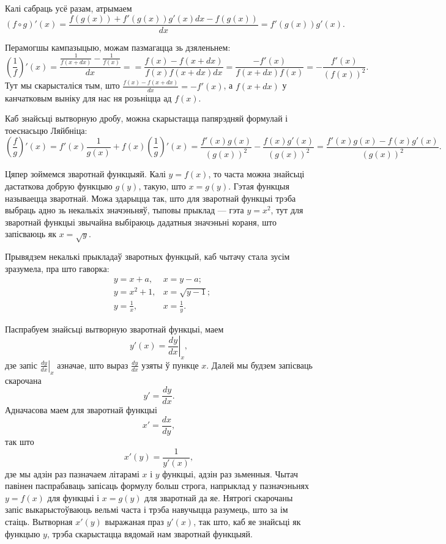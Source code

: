 \documentclass[10pt,a4paper]{book}
\theoremstyle{plain}
\begin{document}
Калі сабраць усё разам, атрымаем
\begin{equation*}
  (f \circ g)'(x) = \frac{f(g(x)) + f'(g(x))g'(x)dx - f(g(x))}{dx} =
  f'(g(x))g'(x).
\end{equation*}

Перамогшы кампазыцыю, можам пазмагацца зь дзяленьнем:
\begin{equation*}
  \left(\frac{1}{f}\right)'(x) = \frac{\frac{1}{f(x+dx)} - \frac{1}{f(x)}}{dx} =
  = \frac{f(x) - f(x+dx)}{f(x)f(x+dx)dx} = \frac{-f'(x)}{f(x+dx)f(x)} =
  - \frac{f'(x)}{(f(x))^2}.
\end{equation*}
Тут мы скарысталіся тым, што $\frac{f(x) - f(x+dx)}{dx} = -f'(x)$, а $f(x+dx)$ у
канчатковым выніку для нас ня розьніцца ад $f(x)$.

Каб знайсьці вытворную дробу, можна скарыстацца папярэдняй формулай і тоеснасьцю
Ляйбніца:
\begin{equation*}
  \left(\frac{f}{g}\right)'(x) = f'(x)\frac{1}{g(x)} +
  f(x)\left(\frac{1}{g}\right)'(x) = \frac{f'(x)g(x)}{(g(x))^2} -
  \frac{f(x)g'(x)}{(g(x))^2} = \frac{f'(x)g(x) - f(x)g'(x)}{(g(x))^2}.
\end{equation*}

Цяпер зоймемся зваротнай функцыяй. Калі $y = f(x)$, то часта можна знайсьці
дастаткова добрую функцыю $g(y)$, такую, што $x = g(y)$. Гэтая функцыя
называецца зваротнай. Можа здарыцца так, што для зваротнай функцыі трэба выбраць
адно зь некалькіх значэньняў, тыповы прыклад --- гэта $y = x^2$, тут для
зваротнай функцыі звычайна выбіраюць дадатныя значэньні кораня, што запісваюць
як $x = \sqrt{y}$.

Прывядзем некалькі прыкладаў зваротных функцый, каб чытачу стала зусім
зразумела, пра што гаворка:
\begin{align*}
  &y = x + a,   &x = y-a; \\
  &y = x^2 + 1, &x = \sqrt{y-1}; \\
  &y = \frac{1}{x}, &x = \frac{1}{y}.
\end{align*}

Паспрабуем знайсьці вытворную зваротнай функцыі, маем
\begin{equation*}
  y'(x) = \left.\frac{dy}{dx}\right|_{x},
\end{equation*}
дзе запіс $\left.\frac{dy}{dx}\right|_{x}$ азначае, што выраз $\frac{dy}{dx}$
узяты ў пункце $x$. Далей мы будзем запісваць скарочана
\begin{equation*}
  y' = \frac{dy}{dx}.
\end{equation*}
Адначасова маем для зваротнай функцыі
\begin{equation*}
  x' = \frac{dx}{dy},
\end{equation*}
так што
\begin{equation*}
  x'(y) = \frac{1}{y'(x)},
\end{equation*}
дзе мы адзін раз пазначаем літарамі $x$ і $y$ функцыі, адзін раз зьменныя. Чытач
павінен паспрабаваць запісаць формулу больш строга, напрыклад у пазначэньнях $y
= f(x)$ для функцыі і $x = g(y)$ для зваротнай да яе. Нятрогі скарочаны запіс
выкарыстоўваюць вельмі часта і трэба навучыцца разумець, што за ім
стаіць. Вытворная $x'(y)$ выражаная праз $y'(x)$, так што, каб яе знайсьці як
функцыю $y$, трэба скарыстацца вядомай нам зваротнай функцыяй.
\end{document}
